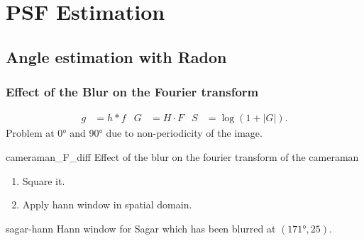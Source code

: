 \section[PSF Estimat.]{PSF Estimation}
\subsection{Angle estimation with Radon}
\begin{frame}[allowframebreaks]
  \frametitle{Effect of the Blur on the Fourier transform}
  \begin{align*}
    g & = h * f
    & G &= H \cdot F
    & S & = \log(1 + |G|).
  \end{align*}
  Problem at \ang{0} and \ang{90} due to non-periodicity of the image.
  \begin{myfig}{cameraman_F_diff}
    {Effect of the blur on the fourier transform of the cameraman}
  \end{myfig}

  \framebreak

  \begin{enumerate}
    \item Square it.
    \item Apply hann window in spatial domain.
  \end{enumerate}
  \begin{myfig}{sagar-hann}
    {Hann window for Sagar which has been blurred at $(\ang{171}, 25)$.}
  \end{myfig}
\end{frame}

